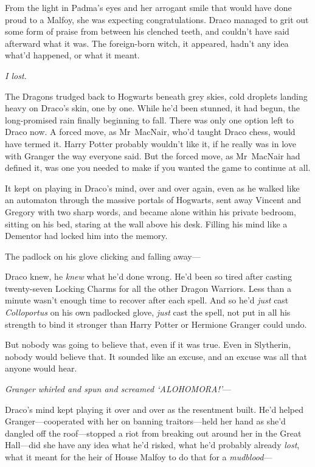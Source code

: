 From the light in Padma’s eyes and her arrogant smile that would have done proud to a Malfoy, she was expecting congratulations. Draco managed to grit out some form of praise from between his clenched teeth, and couldn’t have said afterward what it was. The foreign-born witch, it appeared, hadn’t any idea what’d happened, or what it meant.

\emph{I lost.}

The Dragons trudged back to Hogwarts beneath grey skies, cold droplets landing heavy on Draco’s skin, one by one. While he’d been stunned, it had begun, the long-promised rain finally beginning to fall. There was only one option left to Draco now. A forced move, as Mr~MacNair, who’d taught Draco chess, would have termed it. Harry Potter probably wouldn’t like it, if he really was in love with Granger the way everyone said. But the forced move, as Mr~MacNair had defined it, was one you needed to make if you wanted the game to continue at all.

It kept on playing in Draco’s mind, over and over again, even as he walked like an automaton through the massive portals of Hogwarts, sent away Vincent and Gregory with two sharp words, and became alone within his private bedroom, sitting on his bed, staring at the wall above his desk. Filling his mind like a Dementor had locked him into the memory.

The padlock on his glove clicking and falling away—

Draco knew, he \emph{knew} what he’d done wrong. He’d been so tired after casting twenty-seven Locking Charms for all the other Dragon Warriors. Less than a minute wasn’t enough time to recover after each spell. And so he’d \emph{just} cast \emph{Colloportus} on his own padlocked glove, \emph{just} cast the spell, not put in all his strength to bind it stronger than Harry Potter or Hermione Granger could undo.

But nobody was going to believe that, even if it was true. Even in Slytherin, nobody would believe that. It sounded like an excuse, and an excuse was all that anyone would hear.

\emph{Granger whirled and spun and screamed ‘ALOHOMORA!’}—

Draco’s mind kept playing it over and over as the resentment built. He’d helped Granger—cooperated with her on banning traitors—held her hand as she’d dangled off the roof—stopped a riot from breaking out around her in the Great Hall—did she have any idea what he’d risked, what he’d probably already \emph{lost}, what it meant for the heir of House Malfoy to do that for a \emph{mudblood}—

